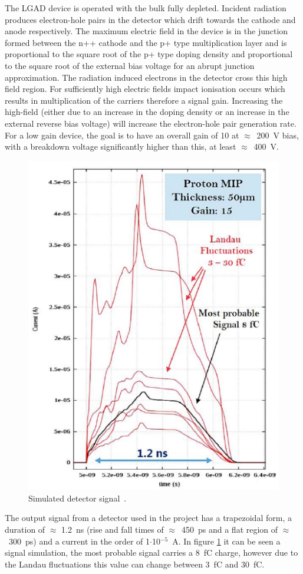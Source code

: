 \noindent The LGAD device is operated with the bulk fully depleted. Incident radiation produces electron-hole
pairs in the detector which drift towards the cathode and anode respectively. The maximum
electric field in the device is in the junction formed between the n++ cathode and the p+ type multiplication layer and is
proportional to the square root of the p+ type doping density and proportional to the square root of the
external bias voltage for an abrupt junction approximation.
The radiation induced electrons in the detector cross this high field region. For sufficiently
high electric fields impact ionisation occurs which results in multiplication of the carriers therefore a signal gain.
Increasing the high-field (either due to an increase in the doping density or
an increase in the external reverse bias voltage) will increase the electron-hole pair generation rate. For a
low gain device, the goal is to have an overall gain of 10 at $\approx$~200~V bias, with a breakdown voltage
significantly higher than this, at least $\approx$~400~V.
\begin{figure}[H]
	\centering
	\includegraphics[width=0.42\linewidth]{IMG/ch2/LGAD_Signal}
	\caption{Simulated detector signal~\cite{dac}.}
	\label{fig:signal}
\end{figure}
\noindent The output signal from a detector used in the project has a trapezoidal form, a duration of $\approx$ 1.2~ns (rise and fall times of $\approx$~450~ps and a  flat region of $\approx$~300~ps) and a current in the order of 1$\cdot$10$^{-5}$~A.
In figure \ref{fig:signal} it can be seen a signal simulation, the most probable signal carries a 8~fC charge, however due to the Landau fluctuations this value can change between 3~fC and 30~fC.

